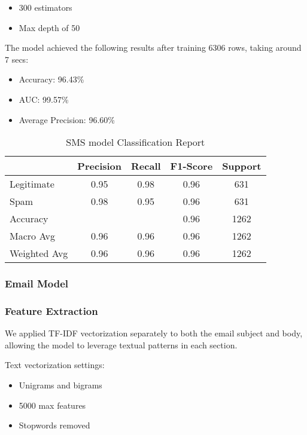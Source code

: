 \documentclass{article}
\begin{document}
\begin{itemize}
    \item 300 estimators
    \item Max depth of 50
\end{itemize}

\noindent
The model achieved the following results after training 6306 rows, taking around 7 secs:

\begin{itemize}
    \item Accuracy: 96.43\%
    \item AUC: 99.57\%
    \item Average Precision: 96.60\%
\end{itemize}

\begin{table}[htbp]
    \centering
    \caption{SMS model Classification Report}
    \begin{tabular}{l c c c c}
    \toprule
     & Precision & Recall & F1-Score & Support \\
    \midrule
    Legitimate & 0.95 & 0.98 & 0.96 & 631 \\
    Spam & 0.98 & 0.95 & 0.96 & 631 \\
    \midrule
    Accuracy & & & 0.96 & 1262 \\
    Macro Avg & 0.96 & 0.96 & 0.96 & 1262 \\
    Weighted Avg & 0.96 & 0.96 & 0.96 & 1262 \\
    \bottomrule
    \end{tabular}
    \label{tab:classification_report_2}
\end{table}

\subsubsection{Email Model}
\subsubsection*{Feature Extraction}
We applied TF-IDF vectorization separately to both the email subject and body, allowing the model to leverage textual patterns in each section.

Text vectorization settings:
\begin{itemize}
    \item Unigrams and bigrams
    \item 5000 max features
    \item Stopwords removed
\end{itemize}
\end{document}
